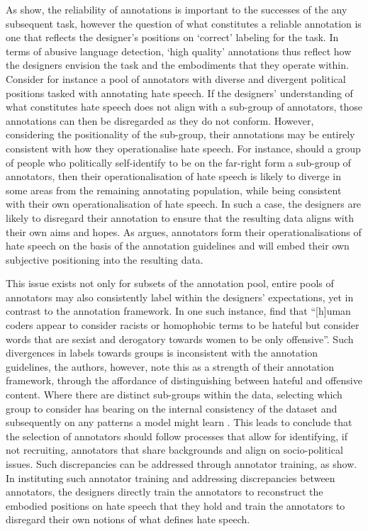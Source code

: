 As \citet{Hovy:2013} show, the reliability of annotations is important to the successes of the any subsequent task, however the question of what constitutes a reliable annotation is one that reflects the designer's positions on `correct' labeling for the task. In terms of abusive language detection, `high quality' annotations thus reflect how the designers envision the task and the embodiments that they operate within. Consider for instance a pool of annotators with diverse and divergent political positions tasked with annotating hate speech. If the designers' understanding of what constitutes hate speech does not align with a sub-group of annotators, those annotations can then be disregarded as they do not conform. However, considering the positionality of the sub-group, their annotations may be entirely consistent with how they operationalise hate speech. For instance, should a group of people who politically self-identify to be on the far-right form a sub-group of annotators, then their operationalisation of hate speech is likely to diverge in some areas from the remaining annotating population, while being consistent with their own operationalisation of hate speech. In such a case, the designers are likely to disregard their annotation to ensure that the resulting data aligns with their own aims and hopes. As \citet{Waseem:2016} argues, annotators form their operationalisations of hate speech on the basis of the annotation guidelines and will embed their own subjective positioning into the resulting data.

This issue exists not only for subsets of the annotation pool, entire pools of annotators may also consistently label within the designers' expectations, yet in contrast to the annotation framework. In one such instance, \citet{Davidson:2017} find that ``[h]uman coders appear to consider racists or homophobic terms to be hateful but consider words that are sexist and derogatory towards women to be only offensive''. Such divergences in labels towards groups is inconsistent with the annotation guidelines, the authors, however, note this as a strength of their annotation framework, through the affordance of distinguishing between hateful and offensive content.
Where there are distinct sub-groups within the data, selecting which group to consider has bearing on the internal consistency of the dataset and subsequently on any patterns a model might learn \citep{Waseem:2016}. This leads \citep{Waseem:2016} to conclude that the selection of annotators should follow processes that allow for identifying, if not recruiting, annotators that share backgrounds and align on socio-political issues.
Such discrepancies can be addressed through annotator training, as \citet{Vidgen:2020} show. In instituting such annotator training and addressing discrepancies between annotators, the designers directly train the annotators to reconstruct the embodied positions on hate speech that they hold and train the annotators to disregard their own notions of what defines hate speech.


